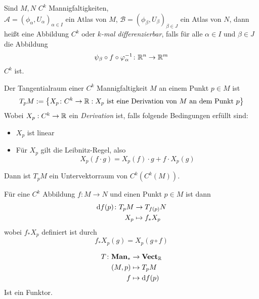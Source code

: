\begin{definition}[Differenzierbarkeit]
    \label{anh.def: differenzierbarkeit}
    Sind $M, N$ $C^k$ Mannigfaltigkeiten, \\ 
    $\mathcal{A} = (\phi_{\alpha}, U_{\alpha})_{\alpha \in I}$ ein Atlas von $M$, 
    $\mathcal{B} = (\phi_{\beta}, U_{\beta})_{\beta \in J}$ ein Atlas von $N$,
    dann heißt eine Abbildung $C^k$ oder \textit{$k$-mal differenzierbar}, falls für alle 
    $\alpha \in I$ und $\beta \in J$ die Abbildung
    \[ \psi_{\beta} \circ f \circ \varphi_{\alpha}^{-1} \colon { \mathbb R }^n \to { \mathbb R }^m \]
    $C^k$ ist.
\end{definition}

\begin{definition}[Tangentialraum]
    \label{anh.def: tangentialraum}
    Der Tangentialraum einer $C^k$ Mannigfaltigkeit $M$ an einem Punkt $p \in M$ ist
    \[ T_pM := \left\{ X_p \colon C^{k} \to { \mathbb R } : X_p 
        \text{ ist eine Derivation von $M$ an dem Punkt $p$} \right\} \]
    Wobei $X_p: C^{k} \to { \mathbb R }$ ein \textit{Derivation} ist, falls folgende Bedingungen erfüllt
    sind:
    \begin{itemize}
        \item $X_p$ ist linear
        \item Für $X_p$ gilt die Leibnitz-Regel, also
            \[ X_p (f \cdot g) = X_p (f) \cdot g + f \cdot X_p (g) \]
    \end{itemize}
    Dann ist $T_pM$ ein Untervektorraum von $C^k(C^k(M))$.

    Für eine $C^k$ Abbildung $f \colon M \to N$  und einen Punkt $p \in M$ ist dann 
    \begin{align*}
        { \operatorname{d} } f (p) \colon T_pM & \to T_{f(p)}N \\
        X_p & \mapsto f_* X_p
    \end{align*}
    wobei $f_*X_p$ definiert ist durch
    \[ f_*X_p (g) = X_p (g \circ f) \]
\end{definition}

\begin{remark}
    \begin{align*}
        T \colon \mathbf{Man}_{*} & \to \mathbf{Vect}_{{ \mathbb R }} \\
        (M, p) & \mapsto T_pM \\
        f & \mapsto { \operatorname{d} } f (p)
    \end{align*}
    Ist ein Funktor.
\end{remark}

